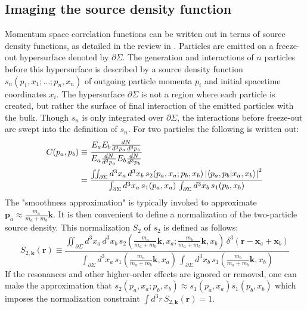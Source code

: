 \subsection{Imaging the source density function}
Momentum space correlation functions can be written out in terms of source density functions, as detailed in the review in .
Particles are emitted on a freeze-out hypersurface denoted by $\partial\Sigma$.
The generation and interactions of $n$ particles before this hypersurface is described by a source density function $s_n(p_1, x_1;\ldots; p_n, x_n)$ of outgoing particle momenta $p_i$ and initial spacetime coordinates $x_i$.
The hypersurface $\partial\Sigma$ is not a region where each particle is created, but rather the surface of final interaction of the emitted particles with the bulk.
Though $s_n$ is only integrated over $\partial\Sigma$, the interactions before freeze-out are swept into the definition of $s_n$.
For two particles the following is written out:
\begin{equation}
  \begin{split}
  C(p_a,p_b) &\equiv \frac{E_a E_b \frac{dN}{d^3 p_a \, d^3 p_b}}{E_a \frac{dN}{d^3 p_a} E_b \frac{dN}{d^3p_b}} 
  \\&= \frac{\iint_{\partial\Sigma} d^3 x_a \, d^3 x_b \, s_2 (p_a, x_a; p_b, x_b) \left| \braket{ p_a, p_b | x_a, x_b } \right|^2}{\int_{\partial\Sigma} d^3 x_a \, s_1 (p_a, x_a) \, \int_{\partial\Sigma} d^3 x_b \, s_1(p_b, x_b)}
  \end{split}
\end{equation}
The "smoothness approximation" is typically invoked to approximate $\mathbf{p}_a \approx \frac{m_a}{m_a+m_b} \mathbf{k}$.
It is then convenient to define a normalization of the two-particle source density.
This normalization $S_2$ of $s_2$ is defined as follows:
\begin{equation} S_{2, \mathbf{k}} (\mathbf{r}) \equiv \frac{\iint_{\partial\Sigma} d^3 x_a \, d^3 x_b \, s_2 \left(\frac{m_a}{m_a+m_b}\mathbf{k}, x_a; \frac{m_b}{m_a+m_b}\mathbf{k}, x_b\right) \, \delta^3(\mathbf{r} - \mathbf{x}_a + \mathbf{x}_b)}{\int_{\partial\Sigma} d^3 x_a \, s_1 \left(\frac{m_a}{m_a+m_b}\mathbf{k}, x_a\right) \, \int_{\partial\Sigma} d^3 x_b \, s_1\left(\frac{m_b}{m_a+m_b}\mathbf{k}, x_b\right)}\end{equation}
If the resonances and other higher-order effects are ignored or removed, one can make the approximation that $s_2 (p_a, x_a; p_b, x_b) \approx s_1(p_a, x_a) s_1(p_b, x_b)$ which imposes the normalization constraint $\int d^3 r \, S_{2,\mathbf{k}}(\mathbf{r}) = 1$.

